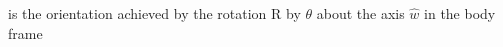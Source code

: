 \documentclass[preview]{standalone}
\begin{document}
\begin{center}
is the orientation achieved by the rotation R by $\theta$ about the axis $\hat{w}$ in the body frame
\end{center}
\end{document}
